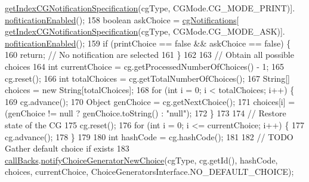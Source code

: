 \begin{DoxyCode}
      \hyperlink{classgov_1_1nasa_1_1jpf_1_1inspector_1_1server_1_1choicegenerators_1_1_choice_generators_manager_a38613d9107860e047acb350d21a0a69d}{getIndexCGNotificationSpecification}(cgType, CGMode.CG\_MODE\_PRINT)].
      \hyperlink{classgov_1_1nasa_1_1jpf_1_1inspector_1_1interfaces_1_1_choice_generators_interface_1_1_c_g_notification_specification_a5c9dc97d25a571dd2911754f31ed923a}{nofiticationEnabled}();
158     \textcolor{keywordtype}{boolean} askChoice = \hyperlink{classgov_1_1nasa_1_1jpf_1_1inspector_1_1server_1_1choicegenerators_1_1_choice_generators_manager_ab6f3e1ad030f6d5af4314d1c27829fa0}{cgNotifications}[
      \hyperlink{classgov_1_1nasa_1_1jpf_1_1inspector_1_1server_1_1choicegenerators_1_1_choice_generators_manager_a38613d9107860e047acb350d21a0a69d}{getIndexCGNotificationSpecification}(cgType, CGMode.CG\_MODE\_ASK)].
      \hyperlink{classgov_1_1nasa_1_1jpf_1_1inspector_1_1interfaces_1_1_choice_generators_interface_1_1_c_g_notification_specification_a5c9dc97d25a571dd2911754f31ed923a}{nofiticationEnabled}();
159     \textcolor{keywordflow}{if} (printChoice == \textcolor{keyword}{false} && askChoice == \textcolor{keyword}{false}) \{
160       \textcolor{keywordflow}{return}; \textcolor{comment}{// No notification are selected}
161     \}
162 
163     \textcolor{comment}{// Obtain all possible choices}
164     \textcolor{keywordtype}{int} currentChoice = cg.getProcessedNumberOfChoices() - 1;
165     cg.reset();
166     \textcolor{keywordtype}{int} totalChoices = cg.getTotalNumberOfChoices();
167     String[] choices = \textcolor{keyword}{new} String[totalChoices];
168     \textcolor{keywordflow}{for} (\textcolor{keywordtype}{int} i = 0; i < totalChoices; i++) \{
169       cg.advance();
170       Object genChoice = cg.getNextChoice();
171       choices[i] = (genChoice != null ? genChoice.toString() : \textcolor{stringliteral}{"null"});
172     \}
173 
174     \textcolor{comment}{// Restore state of the CG}
175     cg.reset();
176     \textcolor{keywordflow}{for} (\textcolor{keywordtype}{int} i = 0; i <= currentChoice; i++) \{
177       cg.advance();
178     \}
179 
180     \textcolor{keywordtype}{int} hashCode = cg.hashCode();
181 
182     \textcolor{comment}{// TODO Gather default choice if exists}
183     \hyperlink{classgov_1_1nasa_1_1jpf_1_1inspector_1_1server_1_1choicegenerators_1_1_choice_generators_manager_a14d8c4ceb0f5b46af959a32499c0d47f}{callBacks}.\hyperlink{interfacegov_1_1nasa_1_1jpf_1_1inspector_1_1interfaces_1_1_inspector_call_backs_a8ebe532769c4bced7461e073fa79a7a0}{notifyChoiceGeneratorNewChoice}(cgType, cg.getId(), 
      hashCode, choices, currentChoice, ChoiceGeneratorsInterface.NO\_DEFAULT\_CHOICE);

\end{DoxyCode}
